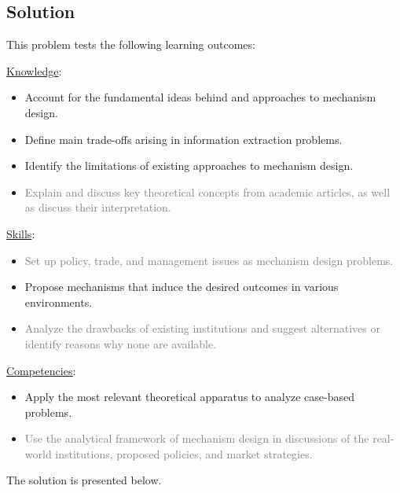 \documentclass[a4paper]{article}
\newif\ifsolutions
\begin{document}
	
	
\ifsolutions
\subsection*{Solution}
	This problem tests the following learning outcomes:
	\begin{framed}
		\underline{Knowledge}:
		\begin{itemize}[$\circ$]
			\item {Account for the fundamental ideas behind and approaches to mechanism design.}
			\item {Define main trade-offs arising in information extraction problems.}
			\item {Identify the limitations of existing approaches to mechanism design.}
			\item \textcolor{gray}{Explain and discuss key theoretical concepts from academic articles, as well as discuss their interpretation.}
		\end{itemize}
		\underline{Skills}:
		\begin{itemize}[$\circ$]
			\item \textcolor{gray}{Set up policy, trade, and management issues as mechanism design problems.}
			\item {Propose mechanisms that induce the desired outcomes in various environments.}
			\item \textcolor{gray}{Analyze the drawbacks of existing institutions and suggest alternatives or identify reasons why none are available.}
		\end{itemize}
		\underline{Competencies}:
		\begin{itemize}[$\circ$]
			\item {Apply the most relevant theoretical apparatus to analyze case-based problems.}
			\item \textcolor{gray}{Use the analytical framework of mechanism design in discussions of the real-world institutions, proposed policies, and market strategies.}
		\end{itemize}
	\end{framed}

	The solution is presented below.
\end{document}
